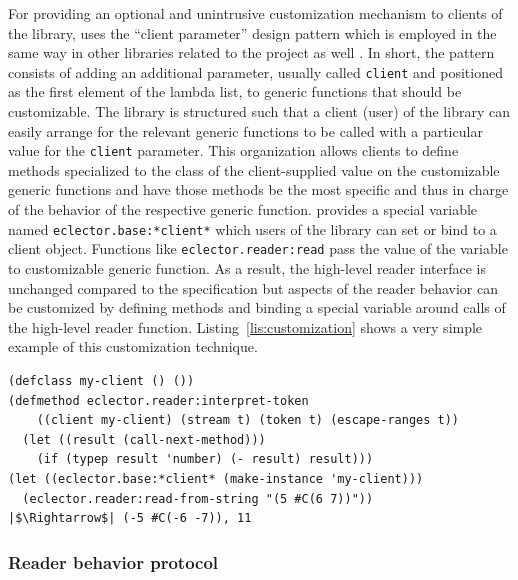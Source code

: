 For providing an optional and unintrusive customization mechanism to
clients of the library, \eclector{} uses the ``client parameter''
design pattern which is employed in the same way in other libraries
related to the \sicl{} project as well%
\cite[Section 3.1]{DBLP:conf/els/StrandhD22}.  In short, the pattern
consists of adding an additional parameter, usually called
\texttt{client} and positioned as the first element of the lambda
list, to generic functions that should be customizable.  The library
is structured such that a client (user) of the library can easily
arrange for the relevant generic functions to be called with a
particular value for the \texttt{client} parameter.  This organization
allows clients to define methods specialized to the class of the
client-supplied value on the customizable generic functions and have
those methods be the most specific and thus in charge of the behavior
of the respective generic function.  \eclector{} provides a special
variable named \texttt{eclector.base:*client*} which users of the
library can set or bind to a client object.  Functions like
\texttt{eclector.reader:read} pass the value of the variable to
customizable generic function.  As a result, the high-level reader
interface is unchanged compared to the \cl{} specification but aspects
of the reader behavior can be customized by defining methods and
binding a special variable around calls of the high-level reader
function.  Listing~\ref{lis:customization} shows a very simple example
of this customization technique.

\begin{listing}
\begin{verbatim}
(defclass my-client () ())
(defmethod eclector.reader:interpret-token
    ((client my-client) (stream t) (token t) (escape-ranges t))
  (let ((result (call-next-method)))
    (if (typep result 'number) (- result) result)))
(let ((eclector.base:*client* (make-instance 'my-client)))
  (eclector.reader:read-from-string "(5 #C(6 7))"))
|$\Rightarrow$| (-5 #C(-6 -7)), 11
\end{verbatim}
\caption{A simple customization that makes the reader negate any
  number tokens (\texttt{\#C} is a reader macro, so only the parts are
  affected) before returning them to the caller.}
\label{lis:customization}
\end{listing}

\subsubsection{Reader behavior protocol}
\label{sec:reader-behavior-protocol}

